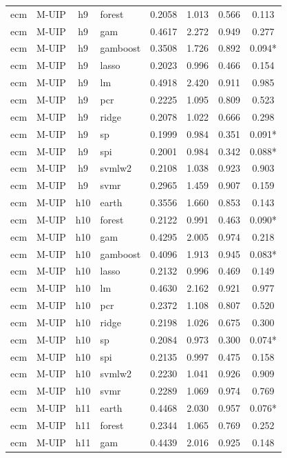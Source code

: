 \begin{ThreePartTable}
\begin{longtable}[t]{llclcccc}
ecm & M-UIP & h9 & forest & 0.2058 & 1.013 & 0.566 & 0.113\\
ecm & M-UIP & h9 & gam & 0.4617 & 2.272 & 0.949 & 0.277\\
ecm & M-UIP & h9 & gamboost & 0.3508 & 1.726 & 0.892 & 0.094*\\
ecm & M-UIP & h9 & lasso & 0.2023 & 0.996 & 0.466 & 0.154\\
ecm & M-UIP & h9 & lm & 0.4918 & 2.420 & 0.911 & 0.985\\
ecm & M-UIP & h9 & pcr & 0.2225 & 1.095 & 0.809 & 0.523\\
ecm & M-UIP & h9 & ridge & 0.2078 & 1.022 & 0.666 & 0.298\\
ecm & M-UIP & h9 & sp & 0.1999 & 0.984 & 0.351 & 0.091*\\
ecm & M-UIP & h9 & spi & 0.2001 & 0.984 & 0.342 & 0.088*\\
ecm & M-UIP & h9 & svmlw2 & 0.2108 & 1.038 & 0.923 & 0.903\\
ecm & M-UIP & h9 & svmr & 0.2965 & 1.459 & 0.907 & 0.159\\
\addlinespace
ecm & M-UIP & h10 & earth & 0.3556 & 1.660 & 0.853 & 0.143\\
ecm & M-UIP & h10 & forest & 0.2122 & 0.991 & 0.463 & 0.090*\\
ecm & M-UIP & h10 & gam & 0.4295 & 2.005 & 0.974 & 0.218\\
ecm & M-UIP & h10 & gamboost & 0.4096 & 1.913 & 0.945 & 0.083*\\
ecm & M-UIP & h10 & lasso & 0.2132 & 0.996 & 0.469 & 0.149\\
ecm & M-UIP & h10 & lm & 0.4630 & 2.162 & 0.921 & 0.977\\
ecm & M-UIP & h10 & pcr & 0.2372 & 1.108 & 0.807 & 0.520\\
ecm & M-UIP & h10 & ridge & 0.2198 & 1.026 & 0.675 & 0.300\\
ecm & M-UIP & h10 & sp & 0.2084 & 0.973 & 0.300 & 0.074*\\
ecm & M-UIP & h10 & spi & 0.2135 & 0.997 & 0.475 & 0.158\\
ecm & M-UIP & h10 & svmlw2 & 0.2230 & 1.041 & 0.926 & 0.909\\
ecm & M-UIP & h10 & svmr & 0.2289 & 1.069 & 0.974 & 0.769\\
\addlinespace
ecm & M-UIP & h11 & earth & 0.4468 & 2.030 & 0.957 & 0.076*\\
ecm & M-UIP & h11 & forest & 0.2344 & 1.065 & 0.769 & 0.252\\
ecm & M-UIP & h11 & gam & 0.4439 & 2.016 & 0.925 & 0.148\\

\end{longtable}
\end{ThreePartTable}

